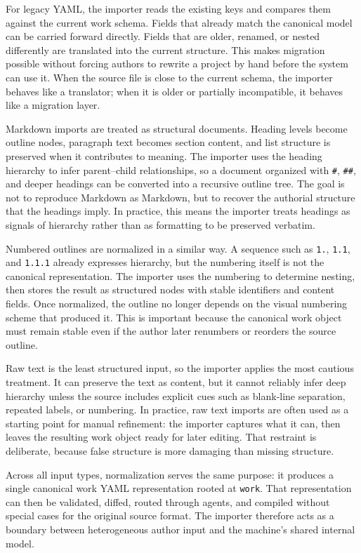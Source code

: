 \documentclass[11pt]{article}
\begin{document}
For legacy YAML, the importer reads the existing keys and compares them against the current work schema. Fields that already match the canonical model can be carried forward directly. Fields that are older, renamed, or nested differently are translated into the current structure. This makes migration possible without forcing authors to rewrite a project by hand before the system can use it. When the source file is close to the current schema, the importer behaves like a translator; when it is older or partially incompatible, it behaves like a migration layer.

Markdown imports are treated as structural documents. Heading levels become outline nodes, paragraph text becomes section content, and list structure is preserved when it contributes to meaning. The importer uses the heading hierarchy to infer parent--child relationships, so a document organized with \texttt{\#}, \texttt{\#\#}, and deeper headings can be converted into a recursive outline tree. The goal is not to reproduce Markdown as Markdown, but to recover the authorial structure that the headings imply. In practice, this means the importer treats headings as signals of hierarchy rather than as formatting to be preserved verbatim.

Numbered outlines are normalized in a similar way. A sequence such as \texttt{1.}, \texttt{1.1}, and \texttt{1.1.1} already expresses hierarchy, but the numbering itself is not the canonical representation. The importer uses the numbering to determine nesting, then stores the result as structured nodes with stable identifiers and content fields. Once normalized, the outline no longer depends on the visual numbering scheme that produced it. This is important because the canonical work object must remain stable even if the author later renumbers or reorders the source outline.

Raw text is the least structured input, so the importer applies the most cautious treatment. It can preserve the text as content, but it cannot reliably infer deep hierarchy unless the source includes explicit cues such as blank-line separation, repeated labels, or numbering. In practice, raw text imports are often used as a starting point for manual refinement: the importer captures what it can, then leaves the resulting work object ready for later editing. That restraint is deliberate, because false structure is more damaging than missing structure.

Across all input types, normalization serves the same purpose: it produces a single canonical work YAML representation rooted at \texttt{work}. That representation can then be validated, diffed, routed through agents, and compiled without special cases for the original source format. The importer therefore acts as a boundary between heterogeneous author input and the machine's shared internal model.
\end{document}

